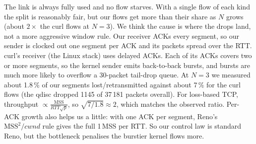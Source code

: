 \documentclass[10pt,a4paper]{article}
\begin{document}
The link is always fully used and no flow starves. With a single flow of each kind the split is reasonably fair, but our flows get
more than their share as $N$ grows (about $2\times$ the curl flows at $N=3$). We think the cause is
where the drops land, not a more aggressive window rule. Our receiver ACKs every
segment, so our sender is clocked out one segment per ACK and its packets spread over the RTT.
curl's receiver (the Linux stack) uses delayed ACKs. Each of its ACKs covers two or more
segments, so the kernel sender emits back-to-back bursts, and bursts are much more likely to
overflow a 30-packet tail-drop queue. At $N=3$ we measured about 1.8\,\% of our segments
lost/retransmitted against about 7\,\% for the curl flows (the qdisc dropped 1145 of
37\,181 packets overall). For loss-based TCP, throughput $\propto \frac{\mathrm{MSS}}{\mathit{RTT}\sqrt{p}}$,
so $\sqrt{7/1.8}\approx 2$, which matches the observed ratio. Per-ACK growth also helps us a
little: with one ACK per segment, Reno's $\mathrm{MSS}^2/\mathit{cwnd}$ rule gives the full
1\,MSS per RTT. So our control law is standard Reno, but the bottleneck penalises the
burstier kernel flows more.
\end{document}
